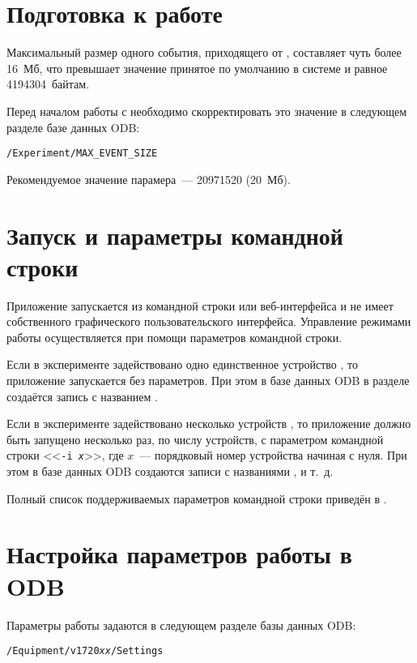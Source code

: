\section{Подготовка к работе}

Максимальный размер одного события, приходящего от \DEVICE{}, составляет чуть более 16~Мб, что превышает значение принятое по умолчанию в системе \MIDAS{} и равное 4194304~байтам.

Перед началом работы с  необходимо скорректировать это значение в следующем разделе базе данных ODB:

\medskip
{\tt /Experiment/MAX\_EVENT\_SIZE}
\medskip

Рекомендуемое значение парамера~--- 20971520 (20~Мб).

\section{Запуск и параметры командной строки}

Приложение  запускается из командной строки или веб-ин\-тер\-фейса \MIDAS{} \cite{MidasWikiMhttpd} и не имеет собственного графического пользовательского интерфейса. Управление режимами работы осуществляется при помощи параметров командной строки.

Если в эксперименте задействовано одно единственное устройство \DEVICE{}, то приложение  запускается без параметров. При этом в базе данных ODB в разделе  \cite{MidasWikiEquipment} создаётся запись с названием .

Если в эксперименте задействовано несколько устройств \DEVICE{}, то приложение  должно быть запущено несколько раз, по числу устройств, с параметром командной строки <<{\tt -i {\it x}}>>, где $x$~--- порядковый номер устройства начиная с нуля. При этом в базе данных ODB создаются записи с названиями ,  и т.~д.

Полный список поддерживаемых параметров командной строки приведён в \cite{MidasWikiFrontend}. 

\section{Настройка параметров работы в ODB}

Параметры работы \DEVICE{} задаются в следующем разделе базы данных ODB:

\medskip

{\tt /Equipment/v1720{\it xx}/Settings}

